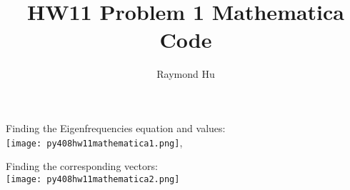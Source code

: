 \documentclass[12pt]{article}
\title{HW11 Problem 1 Mathematica Code}
\author{Raymond Hu}
\date{}
\theoremstyle{definition}
\begin{document}
\maketitle
\doublespacing

Finding the Eigenfrequencies equation and values:\\
\texttt{[image: py408hw11mathematica1.png]},

Finding the corresponding vectors:\\
\texttt{[image: py408hw11mathematica2.png]}
\end{document}
